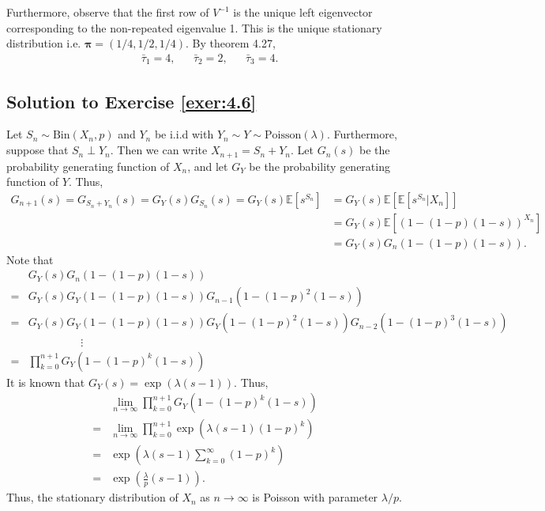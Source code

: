\documentclass[12pt]{book}
\numberwithin{equation}{chapter}
\theoremstyle{plain}
\numberwithin{theorem}{section}
\theoremstyle{definition}
\numberwithin{exercise}{chapter}
\newcommand{\<}{\langle}
\renewcommand{\>}{\rangle}
\renewcommand{\(}{\left(}
\renewcommand{\)}{\right)}
\renewcommand{\[}{\left[}
\renewcommand{\]}{\right]}
\newcommand\Eb{\mathds{E}}
\newcommand\piv{\pmb{\pi}}
\begin{document}
Furthermore, observe that the first row of $V^{-1}$ is the unique left eigenvector corresponding to the non-repeated 
eigenvalue 1. This is the unique stationary distribution i.e. $\piv = (1/4,1/2,1/4)$. By theorem 4.27,
\begin{align}
&\bar \tau_1 	
	= 4,
&&\bar \tau_2
	= 2,
&&\bar \tau_3
	= 4.
\end{align}

\subsection*{Solution to Exercise \ref{exer:4.6}}
Let $S_n \sim \text{Bin}(X_n, p)$ and $Y_n$ be i.i.d with $Y_n \sim Y \sim \text{Poisson}(\lambda)$. Furthermore, 
suppose that $S_n \perp Y_n$. Then we can write $X_{n+1} = S_n + Y_n$. Let $G_n(s)$ be the probability generating 
function of $X_n$, and let $G_Y$ be the probability generating function of $Y$. Thus,
\begin{align}
G_{n+1}(s)
	= G_{S_n + Y_n}(s) 
	= G_{Y}(s) G_{S_n}(s) 
	= G_Y(s) \Eb[ s^{S_n} ] 
	&= G_Y(s) \Eb[ \Eb[ s^{S_n} | X_{n} ] ] \\
	&= G_Y(s) \Eb[ (1 - (1-p)(1-s))^{X_n}] \\
	&= G_Y(s) G_n(1 - (1-p)(1-s)).
\end{align}
Note that
\begin{align}
&G_Y(s) G_n(1 - (1-p)(1-s))\\
	= &G_Y(s) G_Y(1 - (1-p)(1-s)) G_{n-1}(1 - (1-p)^2(1-s)) \\
	= &G_Y(s) G_Y(1 - (1-p)(1-s)) G_{Y}(1 - (1-p)^2(1-s)) G_{n-2}(1 - (1-p)^3(1-s)) \\
	& \hspace{2cm} \vdots \\
	= &\prod_{k=0}^{n+1} G_Y(1 - (1-p)^k (1-s))
\end{align}
It is known that $G_Y(s) = \exp \left( \lambda ( s -1 ) \right)$. Thus, 
\begin{align}
&\lim_{n\to\infty} \prod_{k=0}^{n+1} G_Y(1 - (1-p)^k (1-s)) \\
	= &\lim_{n\to\infty} \prod_{k=0}^{n+1} \exp\(\lambda(s-1) (1-p)^k\) \\ 
	= &\exp \( \lambda (s-1) \sum_{k=0}^\infty (1-p)^k \) \\
	= &\exp \( \frac{\lambda}{p} (s-1) \).
\end{align}
Thus, the stationary distribution of $X_n$ as $n\to\infty$ is Poisson with parameter $\lambda / p$.
\end{document}
